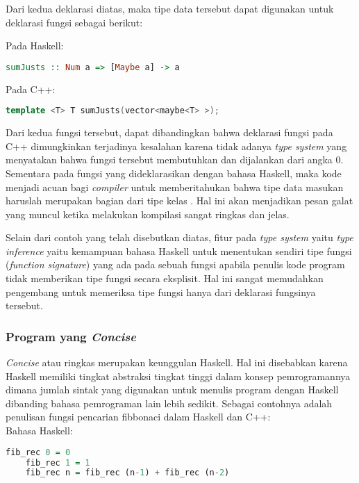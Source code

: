 \documentclass[pi.tex]{subfile}
\begin{document}
  Dari kedua deklarasi diatas, maka tipe data tersebut dapat digunakan untuk deklarasi fungsi sebagai berikut:

  Pada Haskell:\\
  \begin{lstlisting}[language=Haskell]
    sumJusts :: Num a => [Maybe a] -> a
  \end{lstlisting}

  Pada C++:\\
  \begin{lstlisting}[language=C++]
    template <T> T sumJusts(vector<maybe<T> >);
  \end{lstlisting}

  Dari kedua fungsi tersebut, dapat dibandingkan bahwa deklarasi fungsi pada C++ dimungkinkan terjadinya kesalahan karena tidak adanya \emph{type system} yang menyatakan bahwa fungsi tersebut membutuhkan \fhaskell{(+)} dan dijalankan dari angka 0. Sementara pada fungsi yang dideklarasikan dengan bahasa Haskell, maka kode  menjadi acuan bagi \emph{compiler} untuk memberitahukan bahwa tipe data masukan haruslah merupakan bagian dari tipe kelas . Hal ini akan menjadikan pesan galat yang muncul ketika melakukan kompilasi sangat ringkas dan jelas.

  Selain dari contoh yang telah disebutkan diatas, fitur pada \emph{type system} yaitu \emph{type inference} yaitu kemampuan bahasa Haskell untuk menentukan sendiri tipe fungsi (\emph{function signature}) yang ada pada sebuah fungsi apabila penulis kode program tidak memberikan tipe fungsi secara eksplisit. Hal ini sangat memudahkan pengembang untuk memeriksa tipe fungsi hanya dari deklarasi fungsinya tersebut.

 \subsubsection{Program yang \emph{Concise}}
  
  \emph{Concise} atau ringkas merupakan keunggulan Haskell. Hal ini disebabkan karena Haskell memiliki tingkat abstraksi tingkat tinggi dalam konsep pemrogramannya dimana jumlah sintak yang digunakan untuk menulis program dengan Haskell dibanding bahasa pemrograman lain lebih sedikit. Sebagai contohnya adalah penulisan fungsi pencarian fibbonaci dalam Haskell dan C++:\\

  Bahasa Haskell: 
  \begin{lstlisting}[language=Haskell]
    fib_rec 0 = 0
    fib_rec 1 = 1
    fib_rec n = fib_rec (n-1) + fib_rec (n-2)  
  \end{lstlisting}
\end{document}
